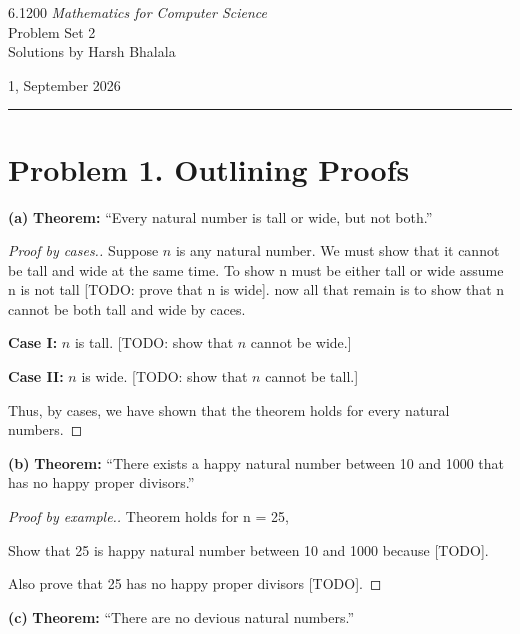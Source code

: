 \documentclass{article}
\begin{document}
\noindent
\begin{minipage}[t]{0.68\textwidth}
    {\large 6.1200 \textit{Mathematics for Computer Science}}\\[4pt]
    {\large Problem Set 2}\\[4pt]
    {\large Solutions by Harsh Bhalala}
\end{minipage}%
\hfill
\begin{minipage}[t]{0.27\textwidth}
    \raggedleft
    {\large 1, September 2026}
\end{minipage}

\vspace{6pt}

\noindent\rule{\textwidth}{0.5pt}

\section*{Problem 1. Outlining Proofs}
\noindent\textbf{(a)} \textbf{Theorem:} “Every natural number is tall or wide, but not both.”

\begin{proof}[Proof by cases.]
Suppose $n$ is any natural number. We must show that it cannot be tall and wide at the same time.
To show n must be either tall or wide assume n is not tall [TODO: prove that n is wide].
now all that remain is to show that n cannot be both tall and wide by caces.

\textbf{Case I:} $n$ is tall. 
[TODO: show that $n$ cannot be wide.]

\textbf{Case II:} $n$ is wide.
[TODO: show that $n$ cannot be tall.]

Thus, by cases, we have shown that the theorem holds for every natural numbers.
\end{proof}

\noindent\textbf{(b)} \textbf{Theorem:} “There exists a happy natural number between 10 and 1000 that has no happy proper divisors.”

\begin{proof}[Proof by example.]
Theorem holds for n = 25,

Show that 25 is happy natural number between 10 and 1000 because [TODO].
    
Also prove that 25 has no happy proper divisors [TODO].

\end{proof}

\noindent\textbf{(c)} \textbf{Theorem:} “There are no devious natural numbers.”
\end{document}
